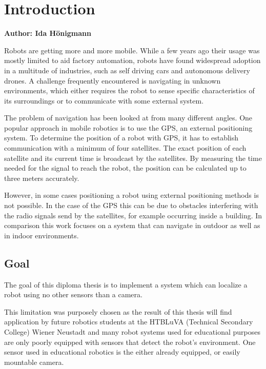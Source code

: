 \chapter{Introduction}

\textbf{Author: Ida Hönigmann}

\vspace{2mm}

Robots are getting more and more mobile. While a few years ago their usage was mostly limited to aid factory automation, robots have found widespread adoption in a multitude of industries, such as self driving cars and autonomous delivery drones.
A challenge frequently encountered is navigating in unknown environments, which either requires the robot to sense specific characteristics of its surroundings or to communicate with some external system.

The problem of navigation has been looked at from many different angles. One popular approach in mobile robotics is to use the GPS, an external positioning system.
To determine the position of a robot with GPS, it has to establish communication with a minimum of four satellites. The exact position of each satellite and its current time is broadcast by the satellites.
By measuring the time needed for the signal to reach the robot, the position can be calculated up to three meters accurately.

However, in some cases positioning a robot using external positioning methods is not possible. In the case of the GPS this can be due to obstacles interfering with the radio signals send by the satellites, for example occurring inside a building. In comparison this work focuses on a system that can navigate in outdoor as well as in indoor environments. 

\section{Goal}
The goal of this diploma thesis is to implement a system which can localize a robot using no other sensors than a camera.

This limitation was purposely chosen as the result of this thesis will find application by future robotics students at the HTBLuVA (Technical Secondary College) Wiener Neustadt and many robot systems used for educational purposes are only poorly equipped with sensors that detect the robot's environment. One sensor used in educational robotics is the either already equipped, or easily mountable camera.

